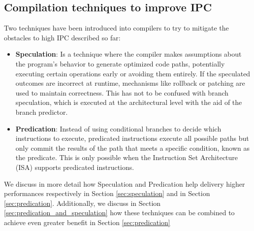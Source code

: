 \subsection{Compilation techniques to improve IPC}

Two techniques have been introduced into compilers to try to mitigate the obstacles to high IPC described so far:

\begin{itemize}
    \item \textbf{Speculation}: Is a technique where the compiler makes assumptions about the program’s behavior to generate optimized code paths, potentially executing certain operations early or avoiding them entirely. If the speculated outcomes are incorrect at runtime, mechanisms like rollback or patching are used to maintain correctness. This has not to be confused with branch speculation, which is executed at the architectural level with the aid of the branch predictor.
    \item \textbf{Predication}: Instead of using conditional branches to decide which instructions to execute, predicated instructions execute all possible paths but only commit the results of the path that meets a specific condition, known as the predicate. This is only possible when the Instruction Set Architecture (ISA) supports predicated instructions.
\end{itemize} 

We discuss in more detail how Speculation and Predication help delivery higher performances respectively in Section \ref{sec:speculation} and in Section \ref{sec:predication}. Additionally, we discuss in Section \ref{sec:predication_and_speculation} how these techniques can be combined to achieve even greater benefit  in Section \ref{sec:predication} 

\newpage